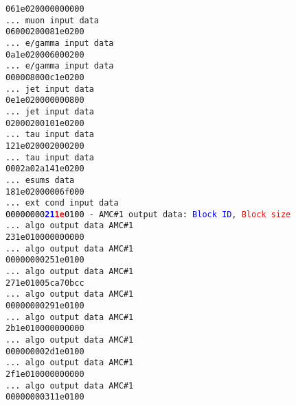 \texttt{061e020000000000}\\
\texttt{... muon input data}\\
\texttt{06000200081e0200}\\
\texttt{... e/gamma input data}\\
\texttt{0a1e020006000200}\\
\texttt{... e/gamma input data}\\
\texttt{000008000c1e0200}\\
\texttt{... jet input data}\\
\texttt{0e1e020000000800}\\
\texttt{... jet input data}\\
\texttt{02000200101e0200}\\
\texttt{... tau input data}\\
\texttt{121e020002000200}\\
\texttt{... tau input data}\\
\texttt{0002a02a141e0200}\\
\texttt{... esums data }\\
\texttt{181e02000006f000}\\
\texttt{... ext cond input data}\\
\texttt{\textcolor{black}{00000000}\textcolor{blue}{\textbf{21}}\textcolor{red}{\textbf{1e}}\textcolor{black}{0100} - AMC\#1 output data: \textcolor{blue}{Block ID}, \textcolor{red}{Block size}}\\
\texttt{... algo output data AMC\#1}\\
\texttt{231e010000000000}\\
\texttt{... algo output data AMC\#1}\\
\texttt{00000000251e0100}\\
\texttt{... algo output data AMC\#1}\\
\texttt{271e01005ca70bcc}\\
\texttt{... algo output data AMC\#1}\\
\texttt{00000000291e0100}\\
\texttt{... algo output data AMC\#1}\\
\texttt{2b1e010000000000}\\
\texttt{... algo output data AMC\#1}\\
\texttt{000000002d1e0100}\\
\texttt{... algo output data AMC\#1}\\
\texttt{2f1e010000000000}\\
\texttt{... algo output data AMC\#1}\\
\texttt{00000000311e0100}\\
